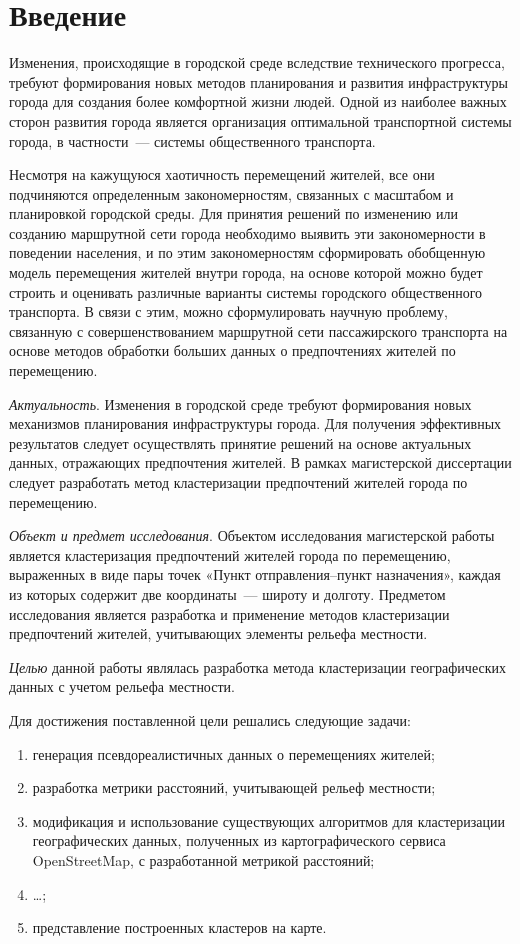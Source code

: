 \part{Введение}

Изменения, происходящие в городской среде вследствие технического прогресса, требуют формирования новых методов планирования и развития инфраструктуры города для создания более комфортной жизни людей. Одной из наиболее важных сторон развития города является организация оптимальной транспортной системы города, в частности~--- системы общественного транспорта.

Несмотря на кажущуюся хаотичность перемещений жителей, все они подчиняются определенным закономерностям, связанных с масштабом и планировкой городской среды. Для принятия решений по изменению или созданию маршрутной сети города необходимо выявить эти закономерности в поведении населения, и по этим закономерностям сформировать обобщенную модель перемещения жителей внутри города, на основе которой можно будет строить и оценивать различные варианты системы городского общественного транспорта. В связи с этим, можно сформулировать научную проблему, связанную с совершенствованием маршрутной сети пассажирского транспорта на основе методов обработки больших данных о предпочтениях жителей по перемещению.

\emph{Актуальность}. Изменения в городской среде требуют формирования новых механизмов планирования инфраструктуры города. Для получения эффективных результатов следует осуществлять принятие решений на основе актуальных данных, отражающих предпочтения жителей. В рамках магистерской диссертации следует разработать метод кластеризации предпочтений жителей города по перемещению.

\emph{Объект и предмет исследования}. Объектом исследования магистерской работы является кластеризация предпочтений жителей города по перемещению, выраженных в виде пары точек «Пункт отправления--пункт назначения», каждая из которых содержит две координаты~--- широту и долготу. Предметом исследования является разработка и применение методов кластеризации предпочтений жителей, учитывающих элементы рельефа местности.

\emph{Целью} данной работы являлась разработка метода кластеризации географических данных с учетом рельефа местности.

Для достижения поставленной цели решались следующие задачи:
\begin{enumerate}
    \item генерация псевдореалистичных данных о перемещениях жителей;
    \item разработка метрики расстояний, учитывающей рельеф местности;
    \item модификация и использование существующих алгоритмов для кластеризации географических данных, полученных из картографического сервиса OpenStreetMap, с разработанной метрикой расстояний;
    \item \ldots;
    \item представление построенных кластеров на карте.
\end{enumerate}

